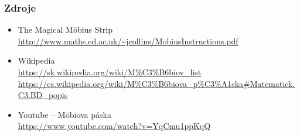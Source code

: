 \documentclass{beamer}
\begin{document}
\begin{frame}
\frametitle{Zdroje}

\begin{itemize}
\item The Magical Möbius Strip \\
\url{http://www.maths.ed.ac.uk/~jcollins/MobiusInstructions.pdf}
\item Wikipedia \\
\url{https://sk.wikipedia.org/wiki/M\%C3\%B6biov_list}\\
\url{https://cs.wikipedia.org/wiki/M\%C3\%B6biova_p\%C3\%A1ska\#Matematick.C3.BD_popis}
\item Youtube -- Möbiova páska \\
\url{https://www.youtube.com/watch?v=YqCmu1ppKqQ}
\end{itemize}
\end{frame} 
\end{document}

